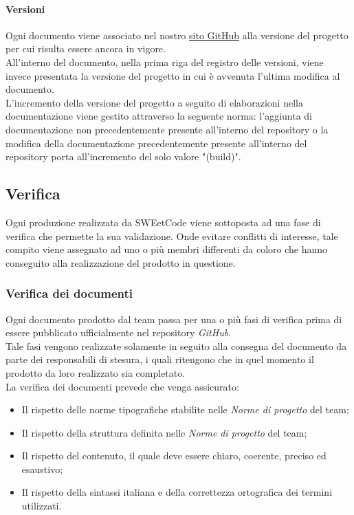 \documentclass[10pt, a4paper]{article}
\begin{document}
        \paragraph{Versioni}Ogni documento viene associato nel nostro \href{https://sweetcode-team.github.io/}{sito GitHub} alla versione del progetto per cui risulta essere ancora in vigore.\\
        All'interno del documento, nella prima riga del registro delle versioni, viene invece presentata la versione del progetto in cui è avvenuta l'ultima modifica al documento.\\
        L'incremento della versione del progetto a seguito di elaborazioni nella documentazione viene gestito attraverso la seguente norma: l'aggiunta di documentazione non precedentemente presente all'interno del repository o la modifica della documentazione precedentemente presente all'interno del repository porta all'incremento del solo valore "(build)".

\subsection{Verifica}
Ogni produzione realizzata da SWEetCode viene sottoposta ad una fase di verifica che permette la sua validazione.
Onde evitare conflitti di interesse, tale compito viene assegnato ad uno o più membri differenti da coloro che hanno conseguito alla realizzazione del prodotto in questione.

\subsubsection{Verifica dei documenti}
Ogni documento prodotto dal team passa per una o più fasi di verifica prima di essere pubblicato ufficialmente nel repository \textit{GitHub}.\\
Tale fasi vengono realizzate solamente in seguito alla consegna del documento da parte dei responsabili di stesura, i quali ritengono che in quel momento il prodotto da loro realizzato sia completato.\\
La verifica dei documenti prevede che venga assicurato:
\begin{itemize}
    \item Il rispetto delle norme tipografiche stabilite nelle \textit{Norme di progetto} del team;
    \item Il rispetto della struttura definita nelle \textit{Norme di progetto} del team;
    \item Il rispetto del contenuto, il quale deve essere chiaro, coerente, preciso ed esaustivo;
    \item Il rispetto della sintassi italiana e della correttezza ortografica dei termini utilizzati.
\end{itemize}
\end{document}
